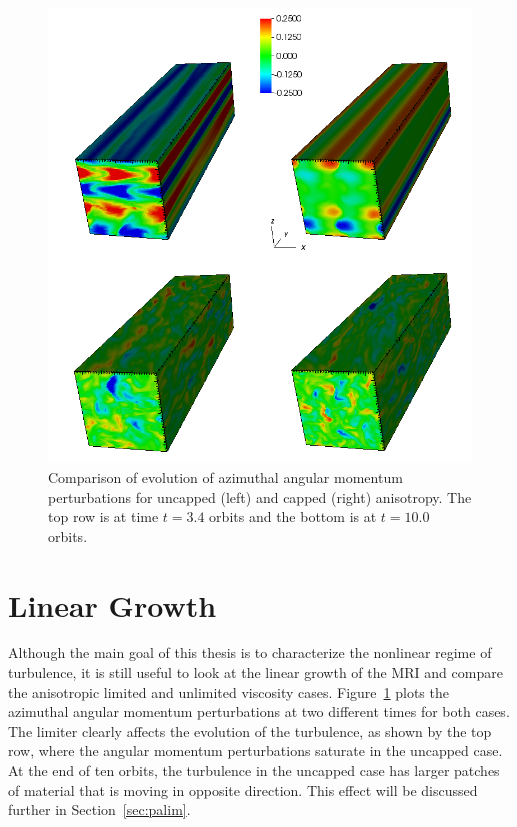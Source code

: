 \begin{figure}[h!]
  \begin{center}  
    \includegraphics[width=.95\textwidth, angle=0.]{img/capped_uncapped_compare_dVy_t34t100.png}
  \end{center}
  \caption{Comparison of evolution of azimuthal angular momentum perturbations for uncapped (left) and capped (right) anisotropy. The top row is at time $t=3.4$ orbits and the bottom is at $t=10.0$ orbits.}
  \label{fig:vtkAn}
\end{figure}
\section{Linear Growth}
%
Although the main goal of this thesis is to characterize the nonlinear regime of turbulence, it is still useful to look at the linear growth of the MRI and compare the anisotropic limited and unlimited viscosity cases. Figure~\ref{fig:vtkAn} plots the azimuthal angular momentum perturbations at two different times for both cases. The limiter clearly affects the evolution of the turbulence, as shown by the top row, where the angular momentum perturbations saturate in the uncapped case. At the end of ten orbits, the turbulence in the uncapped case has larger patches of material that is moving in opposite direction. This effect will be discussed further in Section~\ref{sec:palim}.
%
%
